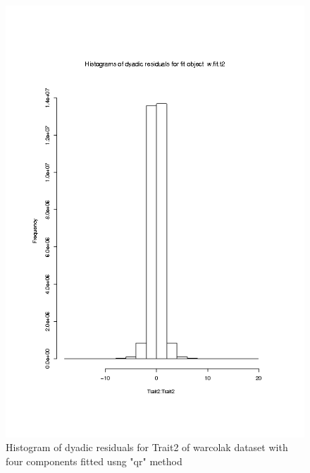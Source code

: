 %

\begin{figure}[h]
  \centering
  \includegraphics[width=1.1\textwidth]{Rplot001.png}
  \caption{Histogram of dyadic residuals for Trait2 of warcolak dataset
           with four components fitted usng "qr" method}
  \label{fig:1}
\end{figure}

%

